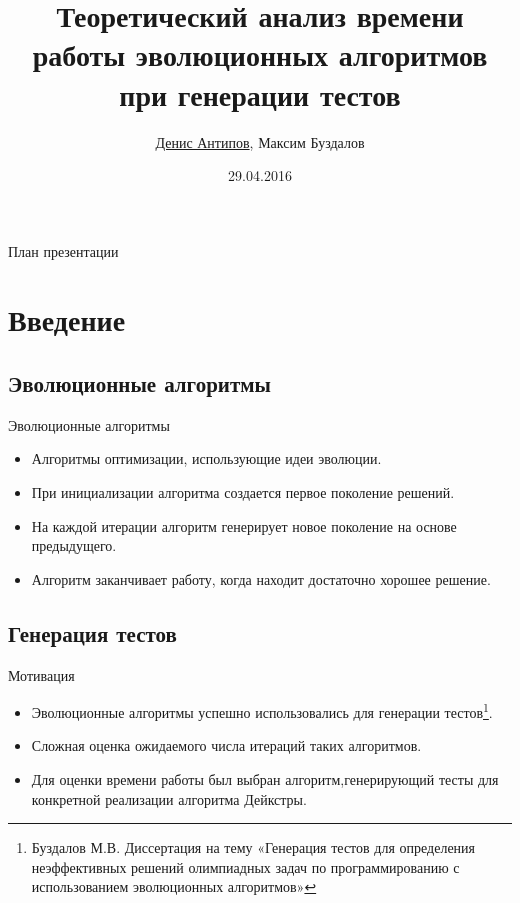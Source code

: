 \documentclass{beamer}
\begin{document}
\title[Автоматическая генерация тестов]{Теоретический анализ времени работы эволюционных алгоритмов при генерации тестов}
\author[Антипов Д.С.]{\underline{Денис Антипов}, Максим Буздалов}
\date{29.04.2016}

 
\begin{frame}
 \maketitle
\end{frame}
 
 \begin{frame}{План презентации}
  \tableofcontents
 \end{frame}

 \section{Введение}
 \subsection{Эволюционные алгоритмы}
 \begin{frame}{Эволюционные алгоритмы}
  \begin{itemize}
   \item Алгоритмы оптимизации, использующие идеи эволюции.
   \item При инициализации алгоритма создается первое поколение решений.
   \item На каждой итерации алгоритм генерирует новое поколение на основе предыдущего.
   \item Алгоритм заканчивает работу, когда находит достаточно хорошее решение.
  \end{itemize}
 \end{frame}
 
 \subsection{Генерация тестов}
 \begin{frame}{Мотивация}
  \begin{itemize}
   \item Эволюционные алгоритмы успешно использовались для генерации тестов\footnote{Буздалов М.В. Диссертация на тему «Генерация тестов для определения неэффективных решений олимпиадных задач по программированию с использованием эволюционных алгоритмов»}.
   \item Сложная оценка ожидаемого числа итераций таких алгоритмов.
   \item Для оценки времени работы был выбран алгоритм,генерирующий тесты для конкретной реализации алгоритма Дейкстры.
  \end{itemize}
 \end{frame}
 
\end{document}
